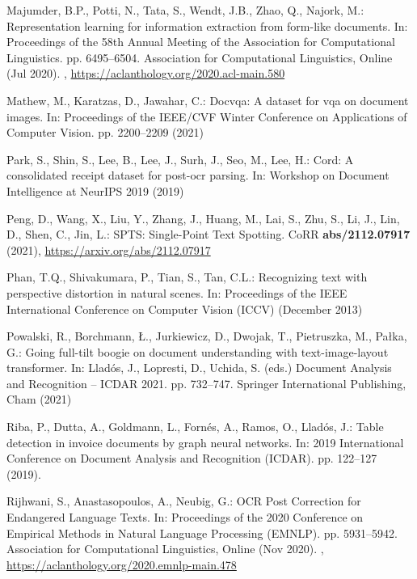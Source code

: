 \documentclass[runningheads]{llncs}
\begin{document}
\begin{thebibliography}{10}
Majumder, B.P., Potti, N., Tata, S., Wendt, J.B., Zhao, Q., Najork, M.:
  Representation learning for information extraction from form-like documents.
  In: Proceedings of the 58th Annual Meeting of the Association for
  Computational Linguistics. pp. 6495--6504. Association for Computational
  Linguistics, Online (Jul 2020). ,
  \url{https://aclanthology.org/2020.acl-main.580}

Mathew, M., Karatzas, D., Jawahar, C.: Docvqa: A dataset for vqa on document
  images. In: Proceedings of the IEEE/CVF Winter Conference on Applications of
  Computer Vision. pp. 2200--2209 (2021)

Park, S., Shin, S., Lee, B., Lee, J., Surh, J., Seo, M., Lee, H.: Cord: A
  consolidated receipt dataset for post-ocr parsing. In: Workshop on Document
  Intelligence at NeurIPS 2019 (2019)

Peng, D., Wang, X., Liu, Y., Zhang, J., Huang, M., Lai, S., Zhu, S., Li, J.,
  Lin, D., Shen, C., Jin, L.: {SPTS:} {S}ingle-{P}oint {T}ext {S}potting. CoRR
  \textbf{abs/2112.07917} (2021), \url{https://arxiv.org/abs/2112.07917}

Phan, T.Q., Shivakumara, P., Tian, S., Tan, C.L.: Recognizing text with
  perspective distortion in natural scenes. In: Proceedings of the IEEE
  International Conference on Computer Vision (ICCV) (December 2013)

Powalski, R., Borchmann, {\L}., Jurkiewicz, D., Dwojak, T., Pietruszka, M.,
  Pa{\l}ka, G.: Going full-tilt boogie on document understanding with
  text-image-layout transformer. In: Llad{\'o}s, J., Lopresti, D., Uchida, S.
  (eds.) Document Analysis and Recognition -- ICDAR 2021. pp. 732--747.
  Springer International Publishing, Cham (2021)

Riba, P., Dutta, A., Goldmann, L., Fornés, A., Ramos, O., Lladós, J.: Table
  detection in invoice documents by graph neural networks. In: 2019
  International Conference on Document Analysis and Recognition (ICDAR). pp.
  122--127 (2019). 

Rijhwani, S., Anastasopoulos, A., Neubig, G.: {OCR} {P}ost {C}orrection for
  {E}ndangered {L}anguage {T}exts. In: Proceedings of the 2020 Conference on
  Empirical Methods in Natural Language Processing (EMNLP). pp. 5931--5942.
  Association for Computational Linguistics, Online (Nov 2020).
  ,
  \url{https://aclanthology.org/2020.emnlp-main.478}


\end{thebibliography}
\end{document}
